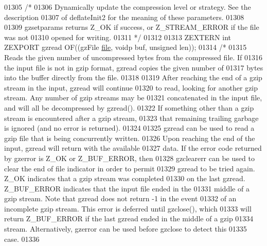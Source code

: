 \begin{DoxyCode}
01305 \textcolor{comment}{/*}
01306 \textcolor{comment}{     Dynamically update the compression level or strategy.  See the description}
01307 \textcolor{comment}{   of deflateInit2 for the meaning of these parameters.}
01308 \textcolor{comment}{}
01309 \textcolor{comment}{     gzsetparams returns Z\_OK if success, or Z\_STREAM\_ERROR if the file was not}
01310 \textcolor{comment}{   opened for writing.}
01311 \textcolor{comment}{*/}
01312 
01313 ZEXTERN \textcolor{keywordtype}{int} ZEXPORT gzread OF((gzFile \hyperlink{structfile}{file}, voidp buf, \textcolor{keywordtype}{unsigned} len));
01314 \textcolor{comment}{/*}
01315 \textcolor{comment}{     Reads the given number of uncompressed bytes from the compressed file.  If}
01316 \textcolor{comment}{   the input file is not in gzip format, gzread copies the given number of}
01317 \textcolor{comment}{   bytes into the buffer directly from the file.}
01318 \textcolor{comment}{}
01319 \textcolor{comment}{     After reaching the end of a gzip stream in the input, gzread will continue}
01320 \textcolor{comment}{   to read, looking for another gzip stream.  Any number of gzip streams may be}
01321 \textcolor{comment}{   concatenated in the input file, and will all be decompressed by gzread().}
01322 \textcolor{comment}{   If something other than a gzip stream is encountered after a gzip stream,}
01323 \textcolor{comment}{   that remaining trailing garbage is ignored (and no error is returned).}
01324 \textcolor{comment}{}
01325 \textcolor{comment}{     gzread can be used to read a gzip file that is being concurrently written.}
01326 \textcolor{comment}{   Upon reaching the end of the input, gzread will return with the available}
01327 \textcolor{comment}{   data.  If the error code returned by gzerror is Z\_OK or Z\_BUF\_ERROR, then}
01328 \textcolor{comment}{   gzclearerr can be used to clear the end of file indicator in order to permit}
01329 \textcolor{comment}{   gzread to be tried again.  Z\_OK indicates that a gzip stream was completed}
01330 \textcolor{comment}{   on the last gzread.  Z\_BUF\_ERROR indicates that the input file ended in the}
01331 \textcolor{comment}{   middle of a gzip stream.  Note that gzread does not return -1 in the event}
01332 \textcolor{comment}{   of an incomplete gzip stream.  This error is deferred until gzclose(), which}
01333 \textcolor{comment}{   will return Z\_BUF\_ERROR if the last gzread ended in the middle of a gzip}
01334 \textcolor{comment}{   stream.  Alternatively, gzerror can be used before gzclose to detect this}
01335 \textcolor{comment}{   case.}
01336 \textcolor{comment}{}

\end{DoxyCode}
